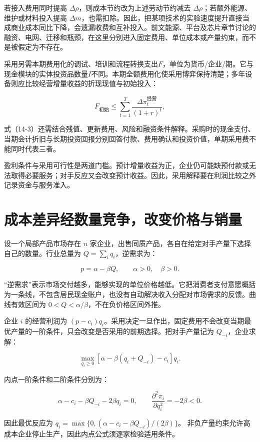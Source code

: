 \documentclass[UTF8,fontset=windows,12pt,a4paper,oneside,openany]{ctexbook}
\begin{document}
若接入费用同时提高 \(\Delta\rho\)，则成本节约改为上述劳动节约减去 \(\Delta\rho\)；若额外能源、维护或材料投入提高 \(\Delta m\)，也需扣除。因此，把某项技术的实验速度提升直接当成商业成本同比下降，会遗漏收费和互补投入。前文能源、平台及芯片章节讨论的融资、电网、迁移和瓶颈，在这里分别进入固定费用、单位成本或产量约束，而不是被假定为不存在。

采用另需本期费用化的调试、培训和流程转换支出$F$，单位为货币/企业/期。它与现金模块的实体投资品数量$I$不同。本期全额费用化使采用博弈保持清楚；多年设备则应比较经营增量收益的折现现值与初始投入：

\[
F_{\text{初始}}\leq
\sum_{t=1}^{T}\frac{\Delta \pi_t^{\text{经营}}}{(1+r)^t},
\tag{14-3}
\]

式（14-3）还需结合残值、更新费用、风险和融资条件解释。采购时的现金支付、当期会计折旧与长期投资回报分别回答付款、费用确认和投资价值，单期采用费不能同时代表三者。

盈利条件与采用可行性是两道门槛。预计增量收益为正，企业仍可能缺预付款或无法取得必要服务；对手反应又会改变预计收益。因此，采用解释要在利润比较之外记录资金与服务准入。

\section{成本差异经数量竞争，改变价格与销量}

设一个局部产品市场存在 \(n\) 家企业，出售同质产品，各自在给定对手产量下选择自己的数量。行业总量为 \(Q=\sum_iq_i\)，逆需求为：

\[
p=\alpha-\beta Q,\qquad \alpha>0,\quad\beta>0.
\tag{14-4}
\]

“逆需求”表示市场交付越多，能够实现的单位价格越低。它把消费者支付意愿概括为一条线，不包含居民现金账户，也没有自动解决收入分配对市场需求的反馈。曲线有效区间为 \(0<Q<\alpha/\beta\)，不在负价格区间外推。

企业 \(i\) 的经营利润为 \((p-c_i)q_i\)。采用决定一旦作出，固定费用不会改变当期最优产量的一阶条件，只会改变是否采用的前期选择。把对手产量记为 \(Q_{-i}\)，企业求解：

\[
\max_{q_i\geq0}
[\alpha-\beta(q_i+Q_{-i})-c_i]q_i.
\]

内点一阶条件和二阶条件分别为：

\[
\alpha-c_i-\beta Q_{-i}-2\beta q_i=0,\qquad
\frac{\partial^2\pi_i}{\partial q_i^2}=-2\beta<0.
\tag{14-5}
\]

因此最优反应为
\(q_i=\max\{0,(\alpha-c_i-\beta Q_{-i})/(2\beta)\}\)。
非负产量约束允许高成本企业停止生产，因此内点公式须逐家检验适用条件。
\end{document}
